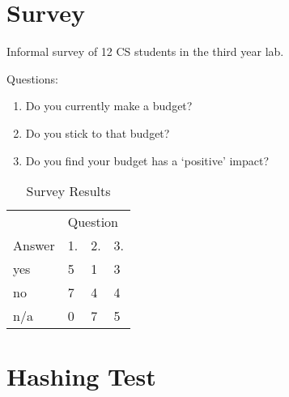 \begin{appendices}

\chapter{Survey} \label{app:budgetsurvey}
Informal survey of 12 CS students in the third year lab. 

Questions:
\begin{enumerate}
\item Do you currently make a budget?
\item Do you stick to that budget?
\item Do you find your budget has a `positive' impact?
\end{enumerate}

\begin{table}[h]
\centering
\caption{Survey Results}
\begin{tabular}{@{}llll@{}}
\toprule
       & \multicolumn{3}{l}{Question} \\ 
Answer & 1.       & 2.      & 3.      \\ \midrule
yes    & 5        & 1       & 3       \\
no     & 7        & 4       & 4       \\
n/a    & 0        & 7       & 5       \\ \bottomrule
\end{tabular}
\end{table}

\begin{comment}
Appendix A, B, C, etc.
These appendices can be very useful for giving detail that would otherwise disrupt the flow and readability of the report. They are given titles (e.g. "Appendix A: Example of the operation of the system") and bound in with the report. In general they are optional though, by convention, for a programming project, Appendix A often contains a non-trivial illustrative example of an input to the system and the corresponding output. For some projects, appendices may include tables of data. However, very long tables of data (more than about 10 pages) should be relegated to the Auxiliary Material, and not submitted as part of the Final Report. Program listings (apart from short code snippets) should likewise not be submitted as part of the Final Report.
\end{comment}

\chapter{Hashing Test} \label{app:hashingtest}


\end{appendices}
